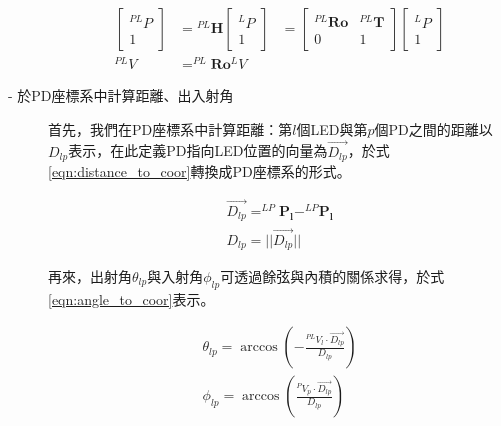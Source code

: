 \begin{description}
        \begin{equation}
            \label{eqn:homogeneous_vector}
            \begin{aligned}
            \left[\begin{array}{cc}
            { }^{P L} P \\
            1
            \end{array}\right]&={ }^{P L} \boldsymbol{H}\left[\begin{array}{c}
            { }^{L} P \\
            1
            \end{array}\right] &=\left[\begin{array}{cc}
            { }^{P L} \boldsymbol{R} \boldsymbol{o} & { }^{P L} \boldsymbol{T} \\
            0 & 1
            \end{array}\right]\left[\begin{array}{c}
            { }^{L} P \\
            1
            \end{array}\right] \\
            ^{P L} V &=^{P L} \boldsymbol{R} \boldsymbol{o} ^{L} V 
            \end{aligned}
        \end{equation}




        \item[- 於PD座標系中計算距離、出入射角]\hfill 
        
        \qquad
        首先，我們在PD座標系中計算距離：第$l$個LED與第$p$個PD之間的距離以$D_{lp}$表示，在此定義PD指向LED位置的向量為$\vec{D_{lp}}$，於式\ref{eqn:distance_to_coor}轉換成PD座標系的形式。
        
        \begin{equation}
            \label{eqn:distance_to_coor}
            \begin{aligned}
            \vec{D_{lp}} = ^{LP}\boldsymbol{P_l}- ^{LP}\boldsymbol{P_l} \\
            D_{lp} = ||\vec{D_{lp}}||
            \end{aligned}
        \end{equation}

        \qquad
        再來，出射角$\theta_{lp}$與入射角$\phi_{lp}$可透過餘弦與內積的關係求得，於式\ref{eqn:angle_to_coor}表示。

        \begin{equation}
            \label{eqn:angle_to_coor}
            \begin{aligned}
            \theta_{lp} = \arccos(-\frac{^{PL}V_l \cdot \vec{D_{lp}}}{D_{lp}})\\
            \phi_{lp} = \arccos(\frac{^{P}V_p \cdot \vec{D_{lp}}}{D_{lp}})\\
            \end{aligned}
        \end{equation}


\end{description}

